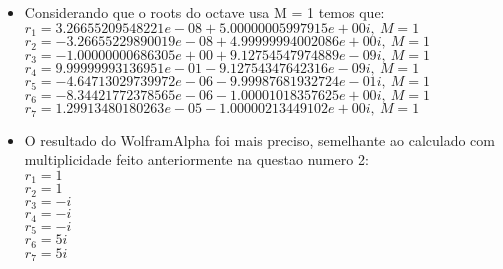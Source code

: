 \documentclass[fleqn]{article}
\begin{document}
\begin{enumerate}
   \begin{itemize}
    \item Considerando que o roots do octave usa M = 1 temos que:\\
        $r_{1} = 3.26655209548221e-08 + 5.00000005997915e+00i,\ M = 1$\\
        $r_{2} = -3.26655229890019e-08 + 4.99999994002086e+00i,\ M =1$\\
        $r_{3} = -1.00000000686305e+00 + 9.12754547974889e-09i,\ M = 1$\\
        $r_{4} = 9.99999993136951e-01 - 9.12754347642316e-09i,\ M = 1$\\
        $r_{5} = -4.64713029739972e-06 - 9.99987681932724e-01i,\ M = 1$\\
        $r_{6} = -8.34421772378565e-06 - 1.00001018357625e+00i,\ M = 1$\\
        $r_{7} = 1.29913480180263e-05 - 1.00000213449102e+00i,\ M = 1$\\
        \newpage
        \item O resultado do WolframAlpha foi mais preciso, semelhante ao calculado com multiplicidade feito anteriormente na questao numero 2:\\
        $r_{1} = 1$\\
        $r_{2} = 1$\\
        $r_{3} = -i$\\
        $r_{4} = -i$\\
        $r_{5} = -i$\\
        $r_{6} = 5i$\\
        $r_{7} = 5i$\\
   \end{itemize}
\end{enumerate}
\end{document}
